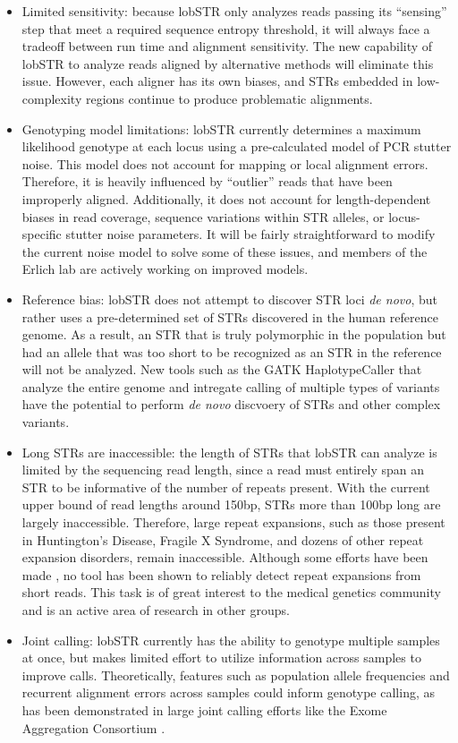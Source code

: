 \begin{itemize}
\item Limited sensitivity: because lobSTR only analyzes reads passing its ``sensing'' step that meet a required sequence entropy threshold, it will always face a tradeoff between run time and alignment sensitivity. The new capability of lobSTR to analyze reads aligned by alternative methods will eliminate this issue. However, each aligner has its own biases, and STRs embedded in low-complexity regions continue to produce problematic alignments.
\item Genotyping model limitations: lobSTR currently determines a maximum likelihood genotype at each locus using a pre-calculated model of PCR stutter noise. This model does not account for mapping or local alignment errors. Therefore, it is heavily influenced by ``outlier'' reads that have been improperly aligned. Additionally, it does not account for length-dependent biases in read coverage, sequence variations within STR alleles, or locus-specific stutter noise parameters. It will be fairly straightforward to modify the current noise model to solve some of these issues, and members of the Erlich lab are actively working on improved models.
\item Reference bias: lobSTR does not attempt to discover STR loci \emph{de novo}, but rather uses a pre-determined set of STRs discovered in the human reference genome. As a result, an STR that is truly polymorphic in the population but had an allele that was too short to be recognized as an STR in the reference will not be analyzed. New tools such as the GATK HaplotypeCaller that analyze the entire genome and intregate calling of multiple types of variants have the potential to perform \emph{de novo} discvoery of STRs and other complex variants.
\item Long STRs are inaccessible: the length of STRs that lobSTR can analyze is limited by the sequencing read length, since a read must entirely span an STR to be informative of the number of repeats present. With the current upper bound of read lengths around 150bp, STRs more than 100bp long are largely inaccessible. Therefore, large repeat expansions, such as those present in Huntington's Disease, Fragile X Syndrome, and dozens of other repeat expansion disorders, remain inaccessible. Although some efforts have been made \cite{DoiMonjoHoangEtAl2013}, no tool has been shown to reliably detect repeat expansions from short reads. This task is of great interest to the medical genetics community and is an active area of research in other groups.
\item Joint calling: lobSTR currently has the ability to genotype multiple samples at once, but makes limited effort to utilize information across samples to improve calls. Theoretically, features such as population allele frequencies and recurrent alignment errors across samples could inform genotype calling, as has been demonstrated in large joint calling efforts like the Exome Aggregation Consortium \cite{EXAC}.
\end{itemize}

